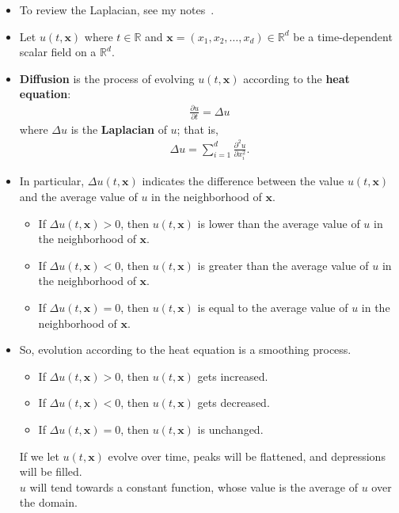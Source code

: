 \documentclass[10pt]{article}
\newcommand{\ve}[1]{\mathbf{#1}}
\newcommand{\Real}{\mathbb{R}}
\begin{document}
\begin{itemize}
    \item To review the Laplacian, see my notes~\cite{Khungurn:Laplacians}.

    \item Let $u(t, \ve{x})$ where $t \in \Real$ and $\ve{x} = (x_1, x_2, \ldots, x_d) \in \Real^d$ be a time-dependent scalar field on a $\Real^d$.
    
    \item {\bf Diffusion} is the process of evolving $u(t, \ve{x})$ according to the {\bf heat equation}:
    \begin{align*}
        \frac{\partial u}{\partial t} = \Delta u
    \end{align*}
    where $\Delta u$ is the {\bf Laplacian} of $u$; that is,
    \begin{align*}
        \Delta u = \sum_{i=1}^d \frac{\partial^2 u}{\partial x_i^2}.
    \end{align*}
    
    \item In particular, $\Delta u(t,\ve{x})$ indicates the difference between the value $u(t,\ve{x})$ and the average value of $u$ in the neighborhood of $\ve{x}$.
    \begin{itemize}
        \item If $\Delta u(t,\ve{x}) > 0$, then $u(t,\ve{x})$ is lower than the average value of $u$ in the neighborhood of $\ve{x}$.
        \item If $\Delta u(t,\ve{x}) < 0$, then $u(t,\ve{x})$ is greater than the average value of $u$ in the neighborhood of $\ve{x}$.
        \item If $\Delta u(t,\ve{x}) = 0$, then $u(t,\ve{x})$ is equal to the average value of $u$ in the neighborhood of $\ve{x}$.
    \end{itemize}

    \item So, evolution according to the heat equation is a smoothing process.
    \begin{itemize}
        \item If $\Delta u(t,\ve{x}) > 0$, then $u(t,\ve{x})$ gets increased.
        \item If $\Delta u(t,\ve{x}) < 0$, then $u(t,\ve{x})$ gets decreased.
        \item If $\Delta u(t,\ve{x}) = 0$, then $u(t,\ve{x})$ is unchanged.
    \end{itemize}
    If we let $u(t,\ve{x})$ evolve over time, peaks will be flattened, and depressions will be filled.\\
    $u$ will tend towards a constant function, whose value is the average of $u$ over the domain.


\end{itemize}
\end{document}

